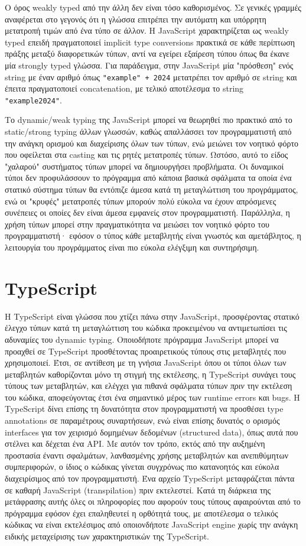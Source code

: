 \documentclass[../thesis.tex]{subfiles}
\begin{document}
Ο όρος weakly typed από την άλλη δεν είναι τόσο καθορισμένος.
Σε γενικές γραμμές αναφέρεται στο γεγονός ότι η γλώσσα επιτρέπει την αυτόματη και υπόρρητη μετατροπή τιμών από ένα τύπο σε άλλον.
Η JavaScript χαρακτηρίζεται ως weakly typed επειδή πραγματοποιεί implicit type conversions πρακτικά σε κάθε περίπτωση πράξης μεταξύ διαφορετικών τύπων, αντί να εγείρει εξαίρεση τύπου όπως θα έκανε μία strongly typed γλώσσα.
Για παράδειγμα, στην JavaScript μία "πρόσθεση" ενός string με έναν αριθμό όπως \texttt{"example" + 2024} μετατρέπει τον αριθμό σε string και έπειτα πραγματοποιεί concatenation, με τελικό αποτέλεσμα το string \texttt{"example2024"}.

Το dynamic/weak typing της JavaScript μπορεί να θεωρηθεί πιο πρακτικό από το static/strong typing άλλων γλωσσών, καθώς απαλλάσσει τον προγραμματιστή από την ανάγκη ορισμού και διαχείρισης όλων των τύπων, ενώ μειώνει τον νοητικό φόρτο  που οφείλεται στα casting και τις ρητές μετατροπές τύπων.
Ωστόσο, αυτό το είδος "χαλαρού" συστήματος τύπων μπορεί να δημιουργήσει προβλήματα.
Οι δυναμικοί τύποι δεν προφυλάσσουν το πρόγραμμα από κάποια βασικά σφάλματα τα οποία ένα στατικό σύστημα τύπων θα εντόπιζε άμεσα κατά τη μεταγλώττιση του προγράμματος, ενώ οι "κρυφές" μετατροπές τύπων μπορούν πολύ εύκολα να έχουν απρόσμενες συνέπειες οι οποίες δεν είναι άμεσα εμφανείς στον προγραμματιστή.
Παράλληλα, η χρήση τύπων μπορεί στην πραγματικότητα να μειώσει τον νοητικό φόρτο του προγραμματιστή· εφόσον ο τύπος κάθε μεταβλητής είναι γνωστός και αμετάβλητος, η λειτουργία του προγράμματος είναι πιο εύκολα ελέγξιμη και συντηρήσιμη.

\section{TypeScript}
Η TypeScript είναι γλώσσα που χτίζει πάνω στην JavaScript, προσφέροντας στατικό έλεγχο τύπων κατά τη μεταγλώττιση του κώδικα προκειμένου να αντιμετωπίσει τις αδυναμίες του dynamic typing.
Οποιοδήποτε πρόγραμμα JavaScript μπορεί να προαχθεί σε TypeScript προσθέτοντας προαιρετικούς τύπους στις μεταβλητές που χρησιμοποιεί.
Έτσι, σε αντίθεση με τη γνήσια JavaScript όπου οι τύποι όλων των μεταβλητών καθορίζονται μόνο τη στιγμή της εκτέλεσης, η TypeScript συνάγει τους τύπους των μεταβλητών, και ελέγχει για πιθανά σφάλματα τύπων \textit{πριν} την εκτέλεση του κώδικα, αποφεύγοντας έτσι ένα σημαντικό μέρος των runtime errors και bugs.
Η TypeScript δίνει επίσης τη δυνατότητα στον προγραμματιστή να προσθέσει type annotations σε παραμέτρους συναρτήσεων, ενώ είναι επίσης δυνατός ο ορισμός interfaces για τον χειρισμό δομημένων δεδομένων (structured data), όπως αυτά που στέλνει και δέχεται ένα API.
Με αυτόν τον τρόπο, εκτός από την αυξημένη προστασία έναντι σφαλμάτων, λανθασμένης χρήσης μεταβλητών και ανεπιθύμητων συμπεριφορών, ο ίδιος ο κώδικας γίνεται συγχρόνως πιο κατανοητός και εύκολα διαχειρίσιμος από τον προγραμματιστή.
Ένα αρχείο TypeScript μεταφράζεται πάντα σε καθαρή JavaScript (transpilation) πριν εκτελεστεί.
Κατά τη διάρκεια της μετάφρασης αυτής όλες οι πληροφορίες που αφορούν τους τύπους αφαιρούνται από το πρόγραμμα εφόσον έχει επαληθευτεί η ορθότητά τους, με αποτέλεσμα ο τελικός κώδικας να είναι εκτελέσιμος από οποιονδήποτε JavaScript engine χωρίς την ανάγκη ειδικής μεταχείρισης των χαρακτηριστικών της TypeScript.
\end{document}
